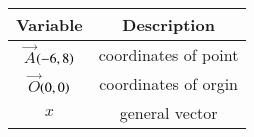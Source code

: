 \begin{tabular}[12pt]{ |c| c|}
    \hline
        \textbf{Variable}  & \textbf{Description}\\
    \hline
        $\vec{A}$$\left(-6,8\right)$ &  coordinates of point\\
    \hline 
        $\vec{O}$$\left(0,0\right)$ & coordinates of orgin\\
    \hline
	$x$ & general vector\\
    \hline 
\end{tabular}
